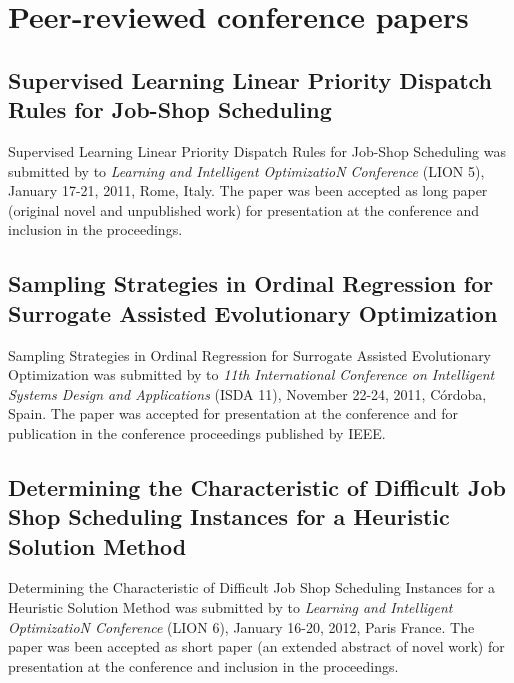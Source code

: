 
\chapter{Peer-reviewed conference papers}\label{app:confpapers} 

\section[LION5]{Supervised Learning Linear Priority Dispatch Rules for Job-Shop Scheduling}\label{app:lion5}
Supervised Learning Linear Priority Dispatch Rules for Job-Shop Scheduling was submitted by \citeauthor{InRu11a} to \emph{Learning and Intelligent OptimizatioN Conference} (LION 5), January 17-21, 2011, Rome, Italy. The paper was been accepted as long paper (original novel and unpublished work) for presentation at the conference and inclusion in the proceedings. 



\section[ISDA11]{Sampling Strategies in Ordinal Regression for Surrogate Assisted Evolutionary Optimization}\label{app:isda2011}
Sampling Strategies in Ordinal Regression for Surrogate Assisted Evolutionary Optimization was submitted by \citeauthor{InRu11b} to \emph{11th International Conference on Intelligent Systems Design and Applications} (ISDA 11), November 22-24, 2011, Córdoba, Spain. The paper was accepted for presentation at the conference and for publication in the conference proceedings published by IEEE.


\section[LION6]{Determining the Characteristic of Difficult Job Shop Scheduling Instances for a Heuristic Solution Method}\label{app:lion6}
Determining the Characteristic of Difficult Job Shop Scheduling Instances for a Heuristic Solution Method was submitted by \citeauthor{InRu12} to \emph{Learning and Intelligent OptimizatioN Conference} (LION 6), January 16-20, 2012, Paris France. The paper was been accepted as short paper (an extended abstract of novel work) for presentation at the conference and inclusion in the proceedings. 

